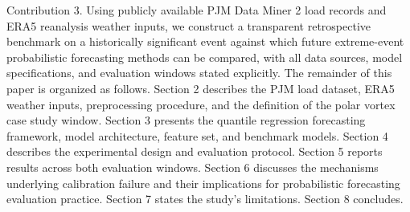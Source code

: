 Contribution 3. Using publicly available PJM Data Miner 2 load records and ERA5 reanalysis weather inputs, we construct a transparent retrospective benchmark on a historically significant event against which future extreme-event probabilistic forecasting methods can be compared, with all data sources, model specifications, and evaluation windows stated explicitly.
The remainder of this paper is organized as follows. Section 2 describes the PJM load dataset, ERA5 weather inputs, preprocessing procedure, and the definition of the polar vortex case study window. Section 3 presents the quantile regression forecasting framework, model architecture, feature set, and benchmark models. Section 4 describes the experimental design and evaluation protocol. Section 5 reports results across both evaluation windows. Section 6 discusses the mechanisms underlying calibration failure and their implications for probabilistic forecasting evaluation practice. Section 7 states the study's limitations. Section 8 concludes.